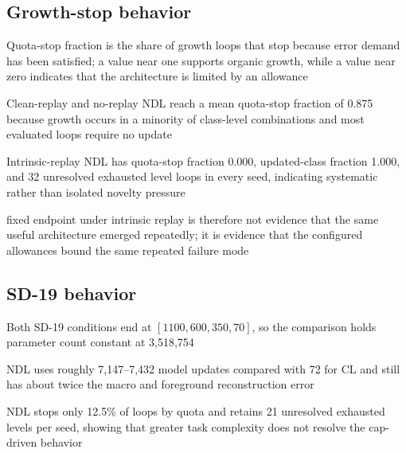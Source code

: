 \subsection{Growth-stop behavior}
\begin{draftpoints}
  \item Quota-stop fraction is the share of growth loops that stop because error demand has been satisfied; a value near one supports organic growth, while a value near zero indicates that the architecture is limited by an allowance
  \item Clean-replay and no-replay NDL reach a mean quota-stop fraction of 0.875 because growth occurs in a minority of class-level combinations and most evaluated loops require no update
  \item Intrinsic-replay NDL has quota-stop fraction 0.000, updated-class fraction 1.000, and 32 unresolved exhausted level loops in every seed, indicating systematic rather than isolated novelty pressure
  \item fixed endpoint under intrinsic replay is therefore not evidence that the same useful architecture emerged repeatedly; it is evidence that the configured allowances bound the same repeated failure mode
\end{draftpoints}

\subsection{SD-19 behavior}
\begin{draftpoints}
  \item Both SD-19 conditions end at $[1100,600,350,70]$, so the comparison holds parameter count constant at 3,518,754
  \item NDL uses roughly 7,147--7,432 model updates compared with 72 for CL and still has about twice the macro and foreground reconstruction error
  \item NDL stops only 12.5\% of loops by quota and retains 21 unresolved exhausted levels per seed, showing that greater task complexity does not resolve the cap-driven behavior
\end{draftpoints}

